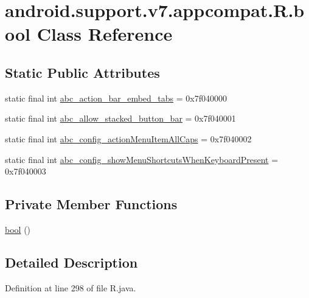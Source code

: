 \hypertarget{classandroid_1_1support_1_1v7_1_1appcompat_1_1_r_1_1bool}{}\section{android.\+support.\+v7.\+appcompat.\+R.\+bool Class Reference}
\label{classandroid_1_1support_1_1v7_1_1appcompat_1_1_r_1_1bool}
\subsection*{Static Public Attributes}
\begin{DoxyCompactItemize}
\item 
static final int \mbox{\hyperlink{classandroid_1_1support_1_1v7_1_1appcompat_1_1_r_1_1bool_a6db41ba5a7c26fd22cbf03d4d2b037a3}{abc\+\_\+action\+\_\+bar\+\_\+embed\+\_\+tabs}} = 0x7f040000
\item 
static final int \mbox{\hyperlink{classandroid_1_1support_1_1v7_1_1appcompat_1_1_r_1_1bool_a17ef40ec47db2450e1d511b32cafe11d}{abc\+\_\+allow\+\_\+stacked\+\_\+button\+\_\+bar}} = 0x7f040001
\item 
static final int \mbox{\hyperlink{classandroid_1_1support_1_1v7_1_1appcompat_1_1_r_1_1bool_ad6fe2e82a81c57a39a1cf48ac06ea06a}{abc\+\_\+config\+\_\+action\+Menu\+Item\+All\+Caps}} = 0x7f040002
\item 
static final int \mbox{\hyperlink{classandroid_1_1support_1_1v7_1_1appcompat_1_1_r_1_1bool_a3ab19dbca326c1a267728200308d7a3d}{abc\+\_\+config\+\_\+show\+Menu\+Shortcuts\+When\+Keyboard\+Present}} = 0x7f040003
\end{DoxyCompactItemize}
\subsection*{Private Member Functions}
\begin{DoxyCompactItemize}
\item 
\mbox{\hyperlink{classandroid_1_1support_1_1v7_1_1appcompat_1_1_r_1_1bool_a50cf3fd59121d7707de23e4e377d3b6a}{bool}} ()
\end{DoxyCompactItemize}


\subsection{Detailed Description}


Definition at line 298 of file R.\+java.



